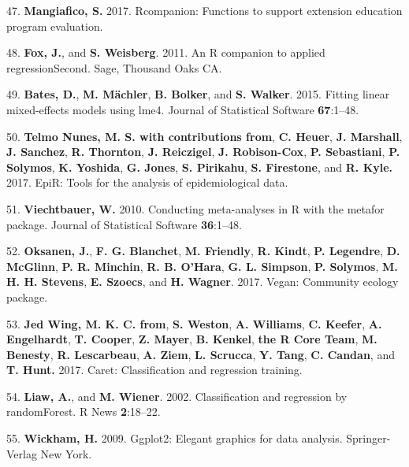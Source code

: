 \documentclass[12pt,]{article}
\begin{document}
\hypertarget{ref-rcompanion_citation_2017}{}
47. \textbf{Mangiafico, S.} 2017. Rcompanion: Functions to support
extension education program evaluation.

\hypertarget{ref-car_citation_2011}{}
48. \textbf{Fox, J.}, and \textbf{S. Weisberg}. 2011. An R companion to
applied regressionSecond. Sage, Thousand Oaks CA.

\hypertarget{ref-lme4_citation_2015}{}
49. \textbf{Bates, D.}, \textbf{M. Mächler}, \textbf{B. Bolker}, and
\textbf{S. Walker}. 2015. Fitting linear mixed-effects models using
lme4. Journal of Statistical Software \textbf{67}:1--48.

\hypertarget{ref-epir_citation_2017}{}
50. \textbf{Telmo Nunes, M. S. with contributions from}, \textbf{C.
Heuer}, \textbf{J. Marshall}, \textbf{J. Sanchez}, \textbf{R. Thornton},
\textbf{J. Reiczigel}, \textbf{J. Robison-Cox}, \textbf{P. Sebastiani},
\textbf{P. Solymos}, \textbf{K. Yoshida}, \textbf{G. Jones}, \textbf{S.
Pirikahu}, \textbf{S. Firestone}, and \textbf{R. Kyle.} 2017. EpiR:
Tools for the analysis of epidemiological data.

\hypertarget{ref-metafor_citation_2010}{}
51. \textbf{Viechtbauer, W.} 2010. Conducting meta-analyses in R with
the metafor package. Journal of Statistical Software \textbf{36}:1--48.

\hypertarget{ref-vegan_citation_2017}{}
52. \textbf{Oksanen, J.}, \textbf{F. G. Blanchet}, \textbf{M. Friendly},
\textbf{R. Kindt}, \textbf{P. Legendre}, \textbf{D. McGlinn}, \textbf{P.
R. Minchin}, \textbf{R. B. O'Hara}, \textbf{G. L. Simpson}, \textbf{P.
Solymos}, \textbf{M. H. H. Stevens}, \textbf{E. Szoecs}, and \textbf{H.
Wagner}. 2017. Vegan: Community ecology package.

\hypertarget{ref-caret_citation_2017}{}
53. \textbf{Jed Wing, M. K. C. from}, \textbf{S. Weston}, \textbf{A.
Williams}, \textbf{C. Keefer}, \textbf{A. Engelhardt}, \textbf{T.
Cooper}, \textbf{Z. Mayer}, \textbf{B. Kenkel}, \textbf{the R Core
Team}, \textbf{M. Benesty}, \textbf{R. Lescarbeau}, \textbf{A. Ziem},
\textbf{L. Scrucca}, \textbf{Y. Tang}, \textbf{C. Candan}, and
\textbf{T. Hunt.} 2017. Caret: Classification and regression training.

\hypertarget{ref-randomforest_citation_2002}{}
54. \textbf{Liaw, A.}, and \textbf{M. Wiener}. 2002. Classification and
regression by randomForest. R News \textbf{2}:18--22.

\hypertarget{ref-ggplot2_citation_2009}{}
55. \textbf{Wickham, H.} 2009. Ggplot2: Elegant graphics for data
analysis. Springer-Verlag New York.
\end{document}
